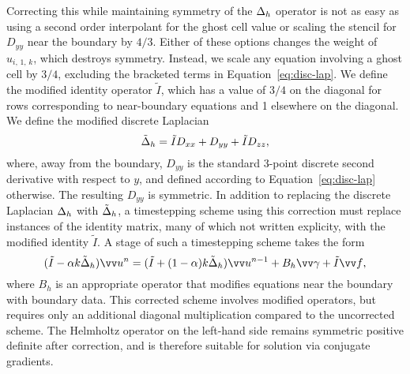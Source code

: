 Correcting this while maintaining symmetry of the $\Delta_h$ operator is not as easy
as using a second order interpolant for the ghost cell value or scaling the stencil for
$D_{yy}$ near the boundary by $4/3$. Either of these options changes the weight of
$u_{i,\,1,\,k}$, which destroys symmetry. Instead, we scale any equation involving a
ghost cell by $3/4$, excluding the bracketed terms in Equation~\eqref{eq:disc-lap}. We
define the modified identity operator $\tilde{I}$, which has a value of $3/4$ on the
diagonal for rows corresponding to near-boundary equations and 1 elsewhere on the
diagonal. We define the modified discrete Laplacian
\begin{equation}\label{eq:mod-disc-lap}
    \tilde{\Delta}_h = \tilde{I}D_{xx} + D_{yy} + \tilde{I}D_{zz},
\end{equation}
where, away from the boundary, $D_{yy}$ is the standard 3-point discrete second
derivative with respect to $y$, and defined according to Equation~\eqref{eq:disc-lap}
otherwise. The resulting $D_{yy}$ is symmetric. In addition to replacing the discrete
Laplacian $\Delta_h$ with $\tilde{\Delta}_h$, a timestepping scheme using this
correction must replace instances of the identity matrix, many of which not written
explicity, with the modified identity $\tilde{I}$. A stage of such a timestepping scheme
takes the form
\begin{equation*}
    (\tilde{I} - \alpha k\tilde{\laplacian}_h)\arr{u}^n = (\tilde{I} + (1-\alpha)k\tilde{\laplacian}_h)\arr{u}^{n-1} + B_h\arr{\gamma} + \tilde{I}\arr{f},
\end{equation*}
where $B_h$ is an appropriate operator that modifies equations near the boundary with
boundary data. This corrected scheme involves modified operators, but requires only an
additional diagonal multiplication compared to the uncorrected scheme. The Helmholtz
operator on the left-hand side remains symmetric positive definite after correction, and
is therefore suitable for solution via conjugate gradients.

